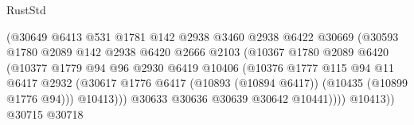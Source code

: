 \begin{lexlean}{RustStd}
\begin{coremodule}
                                        (@30649
                                          @6413
                                          @531
                                          @1781
                                          @142
                                          @2938
                                          @3460
                                          @2938
                                          @6422
                                          @30669
                                          (@30593
                                            @1780
                                            @2089
                                            @142
                                            @2938
                                            @6420
                                            @2666
                                            @2103
                                            (@10367
                                              @1780
                                              @2089
                                              @6420
                                              (@10377
                                                @1779
                                                @94
                                                @96
                                                @2930
                                                @6419
                                                @10406
                                                (@10376
                                                  @1777
                                                  @115
                                                  @94
                                                  @11
                                                  @6417
                                                  @2932
                                                  (@30617
                                                    @1776
                                                    @6417
                                                    (@10893 (@10894 @6417))
                                                    (@10435 (@10899 @1776 @94)))
                                                  @10413)))
                                            @30633
                                            @30636
                                            @30639
                                            @30642
                                            @10441))))
                                    @10413))
                                @30715
                                @30718

\end{coremodule}
\end{lexlean}
